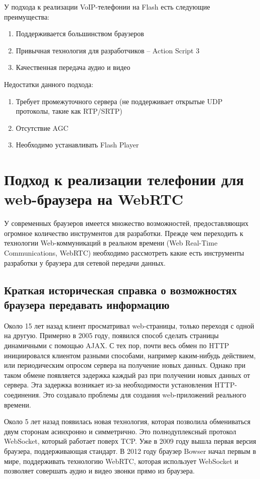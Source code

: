 У подхода к реализации VoIP-телефонии на Flash есть следующие преимущества:
\begin{enumerate}
\item Поддерживается большинством браузеров
\item Привычная технология для разработчиков – Action Script 3
\item Качественная передача аудио и видео
\end{enumerate}

Недостатки данного подхода:
\begin{enumerate}
\item Требует промежуточного сервера (не поддерживает открытые UDP протоколы, такие как RTP/SRTP)
\item Отсутствие AGC
\item Необходимо устанавливать Flash Player
\end{enumerate}

\section{Подход к реализации телефонии для web-браузера на WebRTC}

У современных браузеров имеется множество возможностей, предоставляющих огромное количество инструментов для разработки. Прежде чем переходить к технологии Web-коммуникаций в реальном времени (Web Real-Time Communications, WebRTC) необходимо рассмотреть какие есть инструменты разработки у браузера для сетевой передачи данных.

\subsection{Краткая историческая справка о возможностях браузера передавать информацию}

Около 15 лет назад клиент просматривал web-страницы, только переходя с одной на другую. Примерно в 2005 году, появился способ сделать страницы динамичными с помощью AJAX. С тех пор, почти весь обмен по HTTP инициировался клиентом разными способами, например каким-нибудь действием, или периодическим опросом сервера на получение новых данных. Однако при таком обмене появляется задержка каждый раз при получении новых данных от сервера. Эта задержка возникает из-за необходимости установления HTTP-соединения. Это создавало проблемы для создания web-приложений реального времени.\cite{ajax_problem}

Около 5 лет назад появилась новая технология, которая позволила обмениваться двум сторонам асинхронно и симметрично. Это полнодуплексный протокол WebSocket, который работает поверх TCP. Уже в 2009 году вышла первая версия браузера, поддерживающая стандарт.\cite{web_socket_begining} В 2012 году браузер Bowser начал первым в мире, поддерживать технологию WebRTC, которая использует WebSocket и позволяет совершать аудио и видео звонки прямо из браузера.\cite{bowser}


